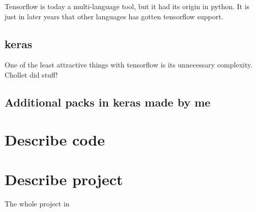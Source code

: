     Tensorflow is today a multi-language tool, but it had its origin in python. It is just in later years that other languages has gotten tensorflow support. 




    \subsection{keras}
    One of the least attractive things with tensorflow is its unnecessary complexity.  
    Chollet did stuff! 
    
    \subsection{Additional packs in keras made by me}
    
\section{Describe code}
    
\section{Describe project}
    
    The whole project in 
